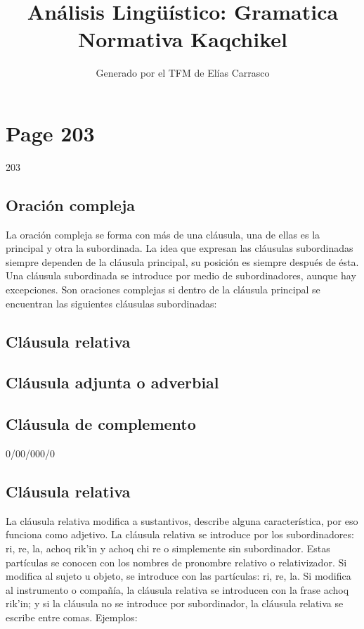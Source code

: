 \documentclass{article}%
\title{Análisis Lingüístico: Gramatica Normativa Kaqchikel}%
\author{Generado por el TFM de Elías Carrasco}%
\begin{document}
%
\normalsize%
\maketitle%
\section{Page 203}%
\label{sec:Page203}%
203 %
\subsection{Oración compleja}%
\label{subsec:Oracincompleja}%

%
La oración compleja se forma con más de una cláusula, una de ellas es la principal y %
otra la subordinada. La idea que expresan las cláusulas subordinadas siempre dependen %
de la cláusula principal, su posición es siempre después de ésta. Una cláusula subordinada %
se introduce por medio de subordinadores, aunque hay excepciones. Son oraciones %
complejas si dentro de la cláusula principal se encuentran las siguientes cláusulas %
subordinadas: %
\subsection{Cláusula relativa}%
\label{subsec:Clusularelativa}%

%
\subsection{Cláusula adjunta o adverbial}%
\label{subsec:Clusulaadjuntaoadverbial}%

%
\subsection{Cláusula de complemento}%
\label{subsec:Clusuladecomplemento}%

%
0/00/000/0 %
\subsection{Cláusula relativa}%
\label{subsec:Clusularelativa}%

%
La cláusula relativa modifica a sustantivos, describe alguna característica, por eso %
funciona como adjetivo. La cláusula relativa se introduce por los subordinadores: ri, %
re, la, achoq rik'in y achoq chi re o simplemente sin subordinador. Estas partículas se %
conocen con los nombres de pronombre relativo o relativizador. Si modifica al sujeto u %
objeto, se introduce con las partículas: ri, re, la. Si modifica al instrumento o compañía, %
la cláusula relativa se introducen con la frase achoq rik'in; y si la cláusula no se %
introduce por subordinador, la cláusula relativa se escribe entre comas. Ejemplos: %
\end{document}
